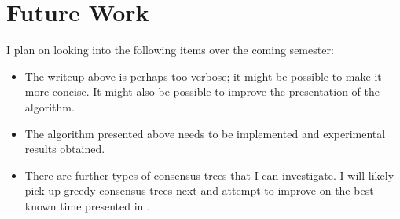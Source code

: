 \documentclass{article}
\begin{document}
    \section{Future Work}
    \label{sec:futurework}

    I plan on looking into the following items over the coming semester:
    \begin{itemize}
        \item The writeup above is perhaps too verbose; it might be possible to make it more concise. It might also be possible to improve the presentation of the algorithm.
        \item The algorithm presented above needs to be implemented and experimental results obtained.
        \item There are further types of consensus trees that I can investigate. I will likely pick up greedy consensus trees next and attempt to improve on the best known time presented in \cite{gawrychowski2017faster}.
    \end{itemize}

    \newpage
    
    
\end{document}

